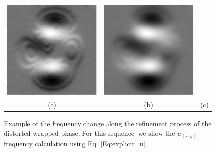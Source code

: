 \begin{figure}[Ht]
\begin{center}
\begin{tabular}{c c c}
      \includegraphics[scale=0.45]{Chpt4_figures/Fig_frecuencias2.eps}&
      \includegraphics[scale=0.45]{Chpt4_figures/Fig_frecuencias3.eps}\\
      (a) & (b) & (c)
    \end{tabular}
  \end{center}
  \caption{Example of the frequency change along the refinement process of the 
  distorted wrapped phase. For this sequence, we show the $u_(x,y)$ frequency 
  calculation using Eq. \ref{Eq:explicit_u}.}
  \label{fig:frecuencias}
\end{figure}

